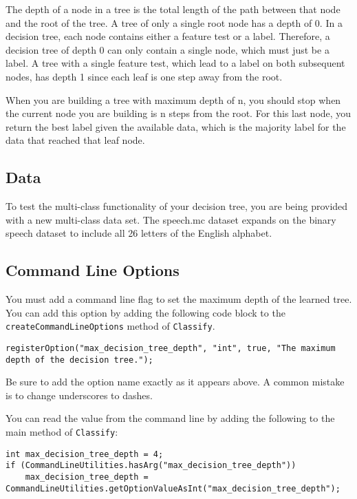 \documentclass[11pt]{article}
\begin{document}
The depth of a node in a tree is the total length of the path between that node and the root of the tree. A tree of only a single root node has a depth of 0. In a decision tree, each node contains either a feature test or a label. Therefore, a decision tree of depth 0 can only contain a single node, which must just be a label. A tree with a single feature test, which lead to a label on both subsequent nodes, has depth 1 since each leaf is one step away from the root.  

When you are building a tree with maximum depth of n, you should stop when the current node you are building is n steps from the root. For this last node, you return the best label given the available data, which is the majority label for the data that reached that leaf node.

\subsection{Data}
To test the multi-class functionality of your decision tree, you are being provided with a new multi-class data set.
The speech.mc dataset expands on the binary speech dataset to include all 26 letters of the English alphabet.


\subsection{Command Line Options}
You must add a command line flag to set the maximum depth of the learned tree. You can add this option by adding the following code block to the {\tt createCommandLineOptions} method of {\tt Classify}.
\begin{footnotesize}
\begin{verbatim}
registerOption("max_decision_tree_depth", "int", true, "The maximum depth of the decision tree.");
\end{verbatim}
\end{footnotesize}

Be sure to add the option name exactly as it appears above. A common mistake is to change underscores to dashes.

You can read the value from the command line by adding the following to the main method of {\tt Classify}:
\begin{footnotesize}
\begin{verbatim}
int max_decision_tree_depth = 4;
if (CommandLineUtilities.hasArg("max_decision_tree_depth"))
    max_decision_tree_depth = CommandLineUtilities.getOptionValueAsInt("max_decision_tree_depth");
\end{verbatim}
\end{footnotesize}
\end{document}
